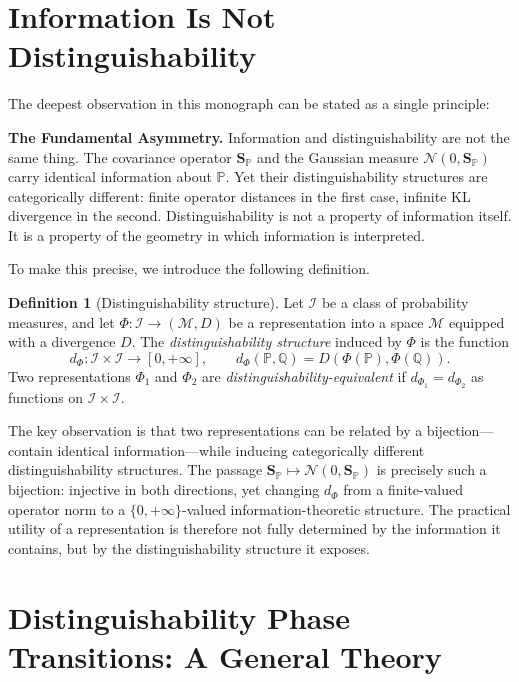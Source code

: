\documentclass[12pt, oneside]{book}
\theoremstyle{plain}
\theoremstyle{definition}
\newtheorem{definition}[theorem]{Definition}
\newcommand{\calN}{\mathcal{N}}
\newcommand{\PP}{\mathbb{P}}
\newcommand{\QQ}{\mathbb{Q}}
\newcommand{\SP}{\mathbf{S}_{\PP}}
\newcommand{\calM}{\mathcal{M}}
\newcommand{\calI}{\mathcal{I}}
\begin{document}
\section{Information Is Not Distinguishability}

The deepest observation in this monograph can be stated as a single principle:

\begin{highlightbox}
\textbf{The Fundamental Asymmetry.} Information and distinguishability are not the same thing. The covariance operator $\SP$ and the Gaussian measure $\calN(0, \SP)$ carry identical information about $\PP$. Yet their distinguishability structures are categorically different: finite operator distances in the first case, infinite KL divergence in the second. Distinguishability is not a property of information itself. It is a property of the geometry in which information is interpreted.
\end{highlightbox}

To make this precise, we introduce the following definition.

\begin{definition}[Distinguishability structure]
\label{def:diststructure}
Let $\calI$ be a class of probability measures, and let $\Phi: \calI \to (\calM, D)$ be a representation into a space $\calM$ equipped with a divergence $D$. The \emph{distinguishability structure} induced by $\Phi$ is the function
\begin{equation}
d_\Phi: \calI \times \calI \to [0, +\infty], \qquad d_\Phi(\PP, \QQ) = D(\Phi(\PP), \Phi(\QQ)).
\end{equation}
Two representations $\Phi_1$ and $\Phi_2$ are \emph{distinguishability-equivalent} if $d_{\Phi_1} = d_{\Phi_2}$ as functions on $\calI \times \calI$.
\end{definition}

The key observation is that two representations can be related by a bijection---contain identical information---while inducing categorically different distinguishability structures. The passage $\SP \mapsto \calN(0, \SP)$ is precisely such a bijection: injective in both directions, yet changing $d_\Phi$ from a finite-valued operator norm to a $\{0, +\infty\}$-valued information-theoretic structure. The practical utility of a representation is therefore not fully determined by the information it contains, but by the distinguishability structure it exposes.

\section{Distinguishability Phase Transitions: A General Theory}
\end{document}
